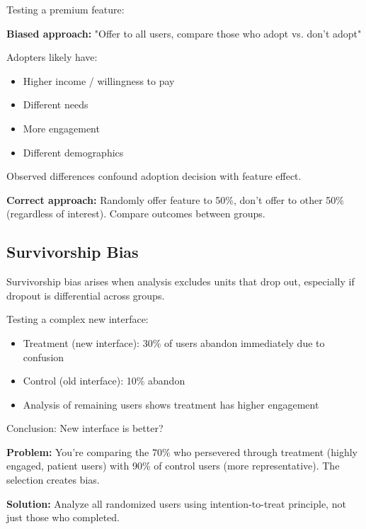 \begin{example}
Testing a premium feature:

\textbf{Biased approach:} "Offer to all users, compare those who adopt vs. don't adopt"

Adopters likely have:
\begin{itemize}
    \item Higher income / willingness to pay
    \item Different needs
    \item More engagement
    \item Different demographics
\end{itemize}

Observed differences confound adoption decision with feature effect.

\textbf{Correct approach:} Randomly offer feature to 50\%, don't offer to other 50\% (regardless of interest). Compare outcomes between groups.
\end{example}

\subsection{Survivorship Bias}

Survivorship bias arises when analysis excludes units that drop out, especially if dropout is differential across groups.

\begin{example}
Testing a complex new interface:

\begin{itemize}
    \item Treatment (new interface): 30\% of users abandon immediately due to confusion
    \item Control (old interface): 10\% abandon
    \item Analysis of remaining users shows treatment has higher engagement
\end{itemize}

Conclusion: New interface is better?

\textbf{Problem:} You're comparing the 70\% who persevered through treatment (highly engaged, patient users) with 90\% of control users (more representative). The selection creates bias.

\textbf{Solution:} Analyze all randomized users using intention-to-treat principle, not just those who completed.
\end{example}


